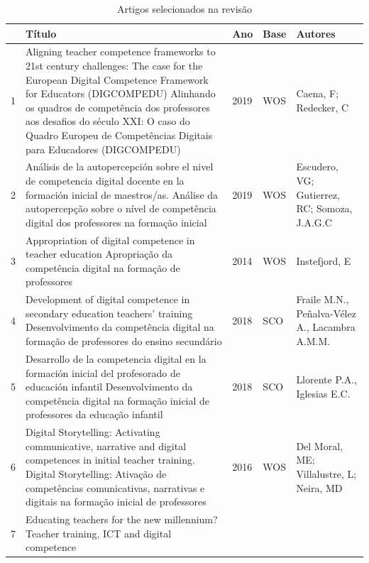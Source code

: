 \documentclass[portuguese]{textolivre}
\begin{document}
\begin{footnotesize}
\renewcommand{\arraystretch}{1.5}
\begin{longtable}{
    @{}l >{\raggedright\arraybackslash}p{}
    ll
    >{\raggedright\arraybackslash}p{}@{}
    }
\caption{Artigos selecionados na revisão}
\label{tbl02}
\\
\toprule
	& Título & Ano & Base & Autores \\
\midrule
1 & Aligning teacher competence frameworks to 21st century challenges: The case for the European Digital Competence Framework for Educators (DIGCOMPEDU) \newline
Alinhando os quadros de competência dos professores aos desafios do século XXI: O caso do Quadro Europeu de Competências Digitais para Educadores (DIGCOMPEDU) & 2019 & WOS & Caena, F; Redecker, C \\
2 & Análisis de la autopercepción sobre el nivel de competencia digital docente en la formación inicial de maestros/as. \newline
Análise da autopercepção sobre o nível de competência digital dos professores na formação inicial & 2019 & WOS	& Escudero, VG; Gutierrez, RC; Somoza, J.A.G.C \\
3 &	Appropriation of digital competence in teacher education \newline
Apropriação da competência digital na formação de professores & 2014 & WOS & Instefjord, E \\
4 & Development of digital competence in secondary education teachers’ training \newline
Desenvolvimento da competência digital na formação de professores do ensino secundário & 2018 & SCO & Fraile M.N., Peñalva-Vélez A., Lacambra A.M.M. \\
5 & Desarrollo de la competencia digital en la formación inicial del profesorado de educación infantil \newline 
Desenvolvimento da competência digital na formação inicial de professores da educação infantil & 2018 & SCO & Llorente P.A., Iglesias E.C. \\
6 & Digital Storytelling: Activating communicative, narrative and digital competences in initial teacher training. \newline 
Digital Storytelling: Ativação de competências comunicativas, narrativas e digitais na formação inicial de professores & 2016 & WOS & Del Moral, ME; Villalustre, L; 
Neira, MD \\
7 & Educating teachers for the new millennium? Teacher training, ICT and digital competence \newline

\end{longtable}
\end{footnotesize}
\end{document}
